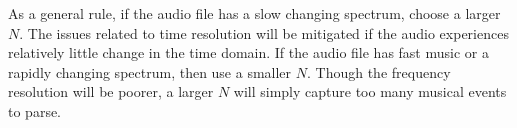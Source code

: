 As a general rule, if the audio file has a slow changing spectrum, choose a larger $N$.  The issues
related to time resolution will be mitigated if the audio experiences relatively little change in the time domain.  If the 
audio file has fast music or a rapidly changing spectrum, then use a smaller $N$.  Though the frequency resolution will be poorer, a larger $N$ will
simply capture too many musical events to parse.  